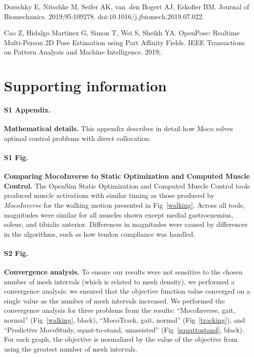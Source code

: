 \documentclass[10pt,letterpaper]{article}
\begin{document}
\begin{thebibliography}{10}
    Dorschky E, Nitschke M, Seifer AK, van~den Bogert AJ, Eskofier BM.
    \newblock Journal of Biomechanics. 2019;95:109278.
    \newblock doi:{10.1016/j.jbiomech.2019.07.022}.

    {Cao} Z, {Hidalgo Martinez} G, {Simon} T, {Wei} S, {Sheikh} YA.
    \newblock OpenPose: Realtime Multi-Person 2D Pose Estimation using Part
    Affinity Fields.
    \newblock IEEE Transactions on Pattern Analysis and Machine Intelligence.
    2019;.

\end{thebibliography}


\section*{Supporting information}

\paragraph*{S1 Appendix.}
\label{S1_Appendix}
{\bf Mathematical details.} This appendix describes in detail how Moco solves optimal control problems with direct collocation.

\paragraph*{S1 Fig.}
\label{S1_Fig}
{\bf Comparing MocoInverse to Static Optimization and Computed Muscle Control.} The OpenSim Static Optimization and Computed Muscle Control tools produced muscle activations with similar timing as those produced by \textit{MocoInverse} for the walking motion presented in Fig~\ref{walking}. Across all tools, magnitudes were similar for all muscles shown except medial gastrocnemius, soleus, and tibialis anterior. Differences in magnitudes were caused by differences in the algorithms, such as how tendon compliance was handled.

\paragraph*{S2 Fig.}
\label{S2_Fig}
{\bf Convergence analysis.}
To ensure our results were not sensitive to the chosen number of mesh intervals (which is related to mesh density), we performed a convergence analysis: we ensured that the objective function value converged on a single value as the number of mesh intervals increased. We performed the convergence analysis for three problems from the results: ``MocoInverse, gait, normal'' (Fig~\ref{walking}, black), ``MocoTrack, gait, normal'' (Fig~\ref{tracking}), and ``Predictive MocoStudy, squat-to-stand, unassisted'' (Fig~\ref{squattostand}, black). For each graph, the objective is normalized by the value of the objective from using the greatest number of mesh intervals.
\end{document}
